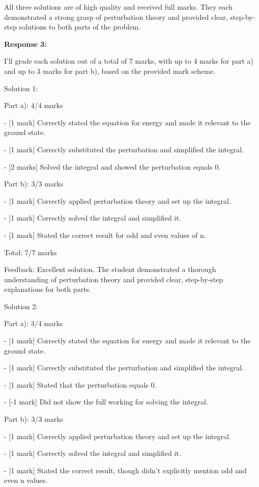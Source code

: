 \documentclass[a4paper,11pt]{article}
\begin{document}
All three solutions are of high quality and received full marks. They each demonstrated a strong grasp of perturbation theory and provided clear, step-by-step solutions to both parts of the problem.

\bigskip   
\textbf{Response 3:}

I'll grade each solution out of a total of 7 marks, with up to 4 marks for part a) and up to 3 marks for part b), based on the provided mark scheme.

Solution 1:

Part a): 4/4 marks

- [1 mark] Correctly stated the equation for energy and made it relevant to the ground state.

- [1 mark] Correctly substituted the perturbation and simplified the integral.

- [2 marks] Solved the integral and showed the perturbation equals 0.

Part b): 3/3 marks

- [1 mark] Correctly applied perturbation theory and set up the integral.

- [1 mark] Correctly solved the integral and simplified it.

- [1 mark] Stated the correct result for odd and even values of n.

Total: 7/7 marks

Feedback: Excellent solution. The student demonstrated a thorough understanding of perturbation theory and provided clear, step-by-step explanations for both parts.

Solution 2:

Part a): 3/4 marks

- [1 mark] Correctly stated the equation for energy and made it relevant to the ground state.

- [1 mark] Correctly substituted the perturbation and simplified the integral.

- [1 mark] Stated that the perturbation equals 0.

- [-1 mark] Did not show the full working for solving the integral.

Part b): 3/3 marks

- [1 mark] Correctly applied perturbation theory and set up the integral.

- [1 mark] Correctly solved the integral and simplified it.

- [1 mark] Stated the correct result, though didn't explicitly mention odd and even n values.
\end{document}
